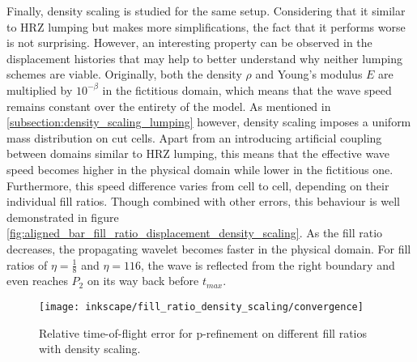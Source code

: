 Finally, density scaling is studied for the same setup. Considering that it similar to HRZ lumping but makes more simplifications, the fact that it performs worse is not surprising. However, an interesting property can be observed in the displacement histories that may help to better understand why neither lumping schemes are viable. Originally, both the density $\rho$ and Young's modulus $E$ are multiplied by $10^{-\beta}$ in the fictitious domain, which means that the wave speed remains constant over the entirety of the model. As mentioned in \ref{subsection:density_scaling_lumping} however, density scaling imposes a uniform mass distribution on cut cells. Apart from an introducing artificial coupling between domains similar to HRZ lumping, this means that the effective wave speed becomes higher in the physical domain while lower in the fictitious one. Furthermore, this speed difference varies from cell to cell, depending on their individual fill ratios. Though combined with other errors, this behaviour is well demonstrated in figure \ref{fig:aligned_bar_fill_ratio_displacement_density_scaling}. As the fill ratio decreases, the propagating wavelet becomes faster in the physical domain. For fill ratios of $\eta=\frac{1}{8}$ and $\eta={1}{16}$, the wave is reflected from the right boundary and even reaches $P_2$ on its way back before $t_{max}$.

\begin{figure}[!h]
	\centering
	\texttt{[image: inkscape/fill\_ratio\_density\_scaling/convergence]}
	\caption{Relative time-of-flight error for p-refinement on different fill ratios with density scaling.}
	\label{fig:aligned_bar_fill_ratio_convergence_density_scaling}
\end{figure}

